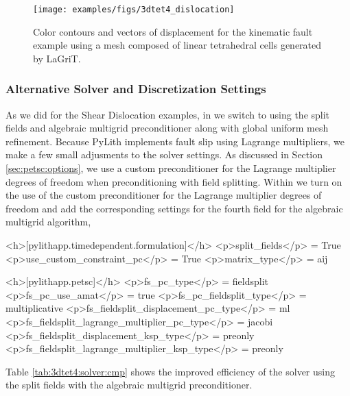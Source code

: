 \begin{figure}
  \texttt{[image: examples/figs/3dtet4\_dislocation]}
  \caption{Color contours and vectors of displacement for the
    kinematic fault example using a mesh composed of linear
    tetrahedral cells generated by LaGriT.}
  \label{fig:3dtet:dislocation}
\end{figure}


\subsubsection{Alternative Solver and Discretization Settings}

As we did for the Shear Dislocation examples, in 
we switch to using the split fields and algebraic multigrid preconditioner
along with global uniform mesh refinement. Because PyLith implements
fault slip using Lagrange multipliers, we make a few small adjusments
to the solver settings. As discussed in Section \vref{sec:petsc:options},
we use a custom preconditioner for the Lagrange multiplier degrees
of freedom when preconditioning with field splitting. Within 
we turn on the use of the custom preconditioner for the Lagrange multiplier
degrees of freedom and add the corresponding settings for the fourth
field for the algebraic multigrid algorithm,
\begin{cfg}
<h>[pylithapp.timedependent.formulation]</h>
<p>split_fields</p> = True
<p>use_custom_constraint_pc</p> = True
<p>matrix_type</p> = aij

<h>[pylithapp.petsc]</h>
<p>fs_pc_type</p> = fieldsplit
<p>fs_pc_use_amat</p> = true
<p>fs_pc_fieldsplit_type</p> = multiplicative
<p>fs_fieldsplit_displacement_pc_type</p> = ml
<p>fs_fieldsplit_lagrange_multiplier_pc_type</p> = jacobi
<p>fs_fieldsplit_displacement_ksp_type</p> = preonly
<p>fs_fieldsplit_lagrange_multiplier_ksp_type</p> = preonly
\end{cfg}
Table \vref{tab:3dtet4:solver:cmp} shows the improved efficiency of
the solver using the split fields with the algebraic multigrid preconditioner.



